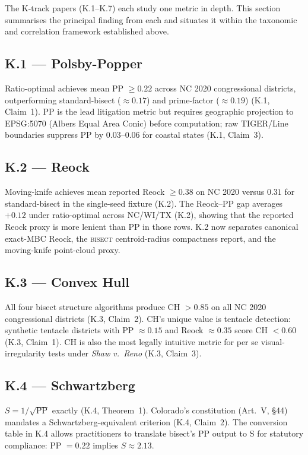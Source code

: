 The K-track papers (K.1--K.7) each study one metric in depth.
This section summarises the principal finding from each and situates it
within the taxonomic and correlation framework established above.

\subsection{K.1 --- Polsby-Popper}

Ratio-optimal achieves mean PP $\geq 0.22$ across NC 2020 congressional districts,
outperforming standard-bisect ($\approx 0.17$) and prime-factor ($\approx 0.19$)
(K.1, Claim~1). PP is the lead litigation metric but requires geographic projection
to EPSG:5070 (Albers Equal Area Conic) before computation; raw TIGER/Line boundaries
suppress PP by $0.03$--$0.06$ for coastal states (K.1, Claim~3).

\subsection{K.2 --- Reock}

Moving-knife achieves mean reported Reock $\geq 0.38$ on NC 2020 versus $0.31$ for
standard-bisect in the single-seed fixture (K.2).
The Reock--PP gap averages $+0.12$ under ratio-optimal across NC/WI/TX
(K.2), showing that the reported Reock proxy is more lenient than PP in those
rows.  K.2 now separates canonical exact-MBC Reock, the \textsc{bisect}
centroid-radius compactness report, and the moving-knife point-cloud proxy.

\subsection{K.3 --- Convex Hull}

All four bisect structure algorithms produce CH $> 0.85$ on all NC 2020
congressional districts (K.3, Claim~2). CH's unique value is tentacle detection:
synthetic tentacle districts with PP $\approx 0.15$ and Reock $\approx 0.35$
score CH $< 0.60$ (K.3, Claim~1). CH is also the most legally intuitive metric
for per se visual-irregularity tests under \textit{Shaw v.\ Reno} (K.3, Claim~3).

\subsection{K.4 --- Schwartzberg}

$S = 1/\sqrt{\text{PP}}$ exactly (K.4, Theorem~1).
Colorado's constitution (Art.\ V, \S 44) mandates a Schwartzberg-equivalent
criterion (K.4, Claim~2). The conversion table in K.4 allows practitioners to
translate bisect's PP output to S for statutory compliance: PP $= 0.22$ implies
$S \approx 2.13$.


